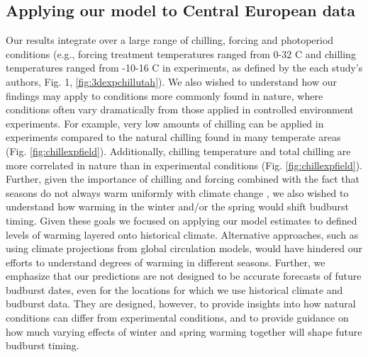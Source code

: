\documentclass{article}
\begin{document}


\subsection*{Applying our model to Central European data}

Our results integrate over a large range of chilling, forcing and photoperiod conditions (e.g., forcing treatment temperatures ranged from 0-32 \degree C and chilling temperatures ranged from -10-16 \degree C in experiments, as defined by the each study's authors, Fig. 1, \ref{fig:3dexpchillutah}). We also wished to understand how our findings may apply to conditions more commonly found in nature, where conditions often vary dramatically from those applied in controlled environment experiments. For example, very low amounts of chilling can be applied in experiments compared to the natural chilling found in many temperate areas (Fig. \ref{fig:chillexpfield}). Additionally, chilling temperature and total chilling are more correlated in nature than in experimental conditions (Fig. \ref{fig:chillexpfield}). Further, given the importance of chilling and forcing combined with the fact that seasons do not always warm uniformly with climate change \citep{vautard2014,eea2019}, we also wished to understand how warming in the winter and/or the spring would shift budburst timing. Given these goals we focused on applying our model estimates to defined levels of warming layered onto historical climate. Alternative approaches, such as using climate projections from global circulation models, would have hindered our efforts to understand degrees of warming in different seasons. Further, we emphasize that our predictions are not designed to be accurate forecasts of future budburst dates, even for the locations for which we use historical climate and budburst data. They are designed, however, to provide insights into how natural conditions can differ from experimental conditions, and to provide guidance on how much varying effects of winter and spring warming together will shape future budburst timing.\\
\end{document}
